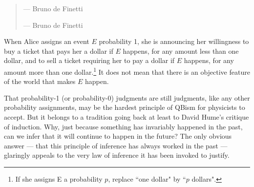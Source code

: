 \documentclass[aps,prb,superscriptaddress,12pt,tightenlines,nofootinbib]{revtex4-2}
\begin{document}
\begin{quote}

\hskip 10pt--- Bruno de Finetti \cite{deFinetti90} %
\vskip 10pt




\hskip 10pt--- Bruno de Finetti \cite{deFinetti31}
\end{quote}


When Alice assigns an event $E$ probability 1, she is announcing her willingness to
buy a ticket that pays her a dollar
if $E$ happens, for  any amount less than one dollar,
and to sell a ticket requiring her to pay a dollar
if $E$ happens, for any amount more than one dollar.\footnote{If she assigns E a probability $p$, replace ``one dollar" by ``$p$ dollars".}  It does not mean that there is an objective feature of the world
that makes $E$  happen.

That probability-1 (or probability-0) judgments are still judgments, like any other probability assignments,  may be the hardest principle of QBism for physicists to accept.    But it belongs to a tradition going back at least to David Hume's critique of induction.   Why, just because something has invariably happened in the past, can we infer that it will continue to happen in the future?       The only obvious answer --- that this principle of inference has always worked in the past --- glaringly appeals to the very law of inference it has been invoked to justify.
\end{document}
